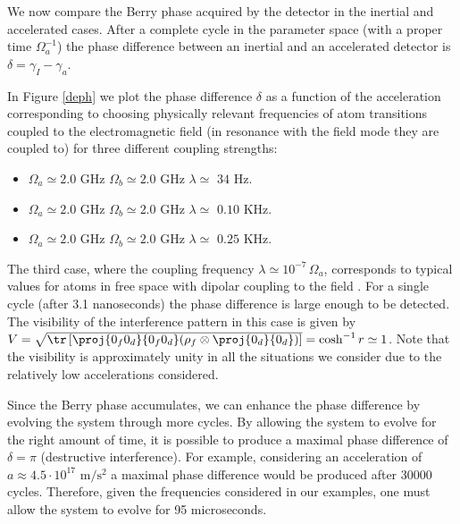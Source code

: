 We now compare the Berry phase acquired by the detector in the inertial and accelerated cases.
After a complete cycle in the parameter space (with a proper time $\Omega_a^{-1}$) the phase difference between an inertial and an accelerated detector is
$\delta =\gamma_{I}-  \gamma_a$.  

In Figure \ref{deph} we plot the phase difference $\delta$ as a function of the acceleration corresponding to choosing physically relevant frequencies of atom transitions \cite{revat,Scully} coupled to the electromagnetic field (in resonance with the field mode they are coupled to) for three different coupling strengths: 
\begin{itemize}
\item $\Omega_a\simeq 2.0$ GHz  $\Omega_b\simeq 2.0$ GHz $\lambda\simeq$ $34$  Hz. 
\item $\Omega_a\simeq 2.0$ GHz  $\Omega_b\simeq 2.0$ GHz  $\lambda\simeq$  $0.10$   KHz. 
\item $\Omega_a\simeq 2.0$ GHz  $\Omega_b\simeq 2.0$ GHz  $\lambda\simeq$ $0.25$  KHz. 
\end{itemize}
The third case, where the coupling frequency $\lambda \simeq 10^{-7}\,\Omega_a$, corresponds to typical values for atoms in  free space with dipolar coupling  to the field \cite{revat}. For a single cycle (after 3.1 nanoseconds) the phase difference is large enough to be detected. The visibility of the interference pattern in this case is given by $V=\sqrt{\tr\left[\proj{0_f0_d}{0_f0_d}(\rho_f\otimes{\proj{0_d}{0_d}})\right]}=\cosh^{-1}r\simeq 1$. Note that the visibility is approximately  unity in all the situations we consider due to the relatively low accelerations considered. 

Since the Berry phase accumulates, we can enhance the phase difference by evolving the system through more cycles. By allowing the system to evolve for the right amount of time, it is possible to produce a maximal phase difference of $\delta=\pi$ (destructive interference). For example, considering an acceleration  of $a\approx 4.5\cdot10^{17}$ $\text{m}/\text{s}^2$  a maximal phase difference would be produced after $30000$ cycles.  Therefore, given the frequencies considered in our examples, one must allow the system to evolve for 95 microseconds. 

